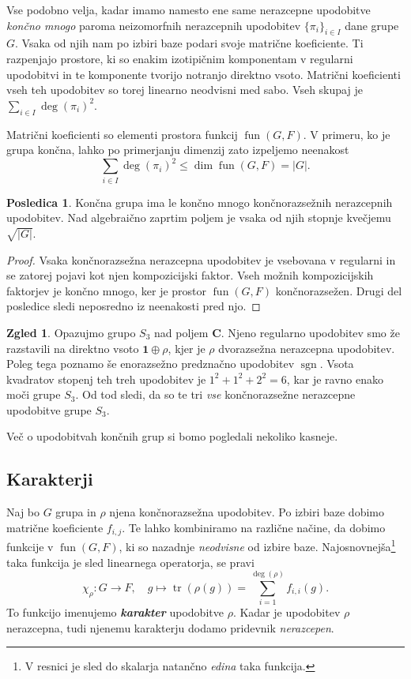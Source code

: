 \documentclass[11pt]{book}
\def\CC{\mathbf{C}}
\def\11{\mathbf{1}}
\DeclareMathOperator\sgn{sgn}
\DeclareMathOperator\tr{tr}
\DeclareMathOperator\fun{fun}
\def\definicija{\color{rdeca}\bf\em}
\theoremstyle{definition}
\theoremstyle{zgled}
\newtheorem*{zgled}{Zgled}
\theoremstyle{odprtproblem}
\theoremstyle{domacanaloga}
\newenvironment{dokaz}
    {\color{siva}\begin{proof}}
    {\end{proof}}
\theoremstyle{izrek}
\newtheorem*{posledica}{Posledica}
\begin{document}
Vse podobno velja, kadar imamo namesto ene same nerazcepne upodobitve \emph{končno mnogo} paroma neizomorfnih nerazcepnih upodobitev $\{ \pi_i \}_{i \in I}$ dane grupe $G$. Vsaka od njih nam po izbiri baze podari svoje matrične koeficiente. Ti razpenjajo prostore, ki so enakim izotipičnim komponentam v regularni upodobitvi in te komponente tvorijo notranjo direktno vsoto. Matrični koeficienti vseh teh upodobitev so torej linearno neodvisni med sabo. Vseh skupaj je $\sum_{i \in I} \deg(\pi_i)^2$. 

Matrični koeficienti so elementi prostora funkcij $\fun(G,F)$. V primeru, ko je grupa končna, lahko po primerjanju dimenzij zato izpeljemo neenakost
\[
    \sum_{i \in I} \deg(\pi_i)^2 \leq \dim \fun(G,F) = |G|.
\]

\begin{posledica}
Končna grupa ima le končno mnogo končnorazsežnih nerazcepnih upodobitev. Nad algebraično zaprtim poljem je vsaka od njih stopnje kvečjemu $\sqrt{|G|}$.
\end{posledica}
\begin{dokaz}
Vsaka končnorazsežna nerazcepna upodobitev je vsebovana v regularni in se zatorej pojavi kot njen kompozicijski faktor. Vseh možnih kompozicijskih faktorjev je končno mnogo, ker je prostor $\fun(G,F)$ končnorazsežen. Drugi del posledice sledi neposredno iz neenakosti pred njo.
\end{dokaz}

\begin{zgled}
    Opazujmo grupo $S_3$ nad poljem $\CC$. Njeno regularno upodobitev smo že razstavili na direktno vsoto $\11 \oplus \rho$, kjer je $\rho$ dvorazsežna nerazcepna upodobitev. Poleg tega poznamo še enorazsežno predznačno upodobitev $\sgn$. Vsota kvadratov stopenj teh treh upodobitev je $1^2 + 1^2 + 2^2 = 6$, kar je ravno enako moči grupe $S_3$. Od tod sledi, da so te tri \emph{vse} končnorazsežne nerazcepne upodobitve grupe $S_3$.
\end{zgled}

Več o upodobitvah končnih grup si bomo pogledali nekoliko kasneje.

\subsection{Karakterji}

Naj bo $G$ grupa in $\rho$ njena končnorazsežna upodobitev. Po izbiri baze dobimo matrične koeficiente $f_{i,j}$. Te lahko kombiniramo na različne načine, da dobimo funkcije v $\fun(G,F)$, ki so nazadnje \emph{neodvisne} od izbire baze. Najosnovnejša\footnote{V resnici je sled do skalarja natančno \emph{edina} taka funkcija.} taka funkcija je sled linearnega operatorja, se pravi
\[
    \textstyle \chi_{\rho} \colon G \to F, \quad
    g \mapsto \tr(\rho(g)) = \sum_{i = 1}^{\deg(\rho)} f_{i,i}(g).
\]
To funkcijo imenujemo {\definicija karakter} upodobitve $\rho$. Kadar je upodobitev $\rho$ nerazcepna, tudi njenemu karakterju dodamo pridevnik \emph{nerazcepen}. 
\end{document}
